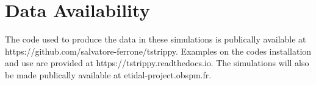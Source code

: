 \documentclass{aa}
\begin{document}
\section*{Data Availability}

  The code used to produce the data in these simulations is publically available at https://github.com/salvatore-ferrone/tstrippy. Examples on the codes installation and use are provided at https://tstrippy.readthedocs.io. The simulations will also be made publically available at etidal-project.obspm.fr.







\end{document}
